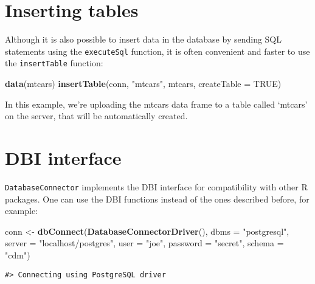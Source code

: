 \documentclass[]{article}
\newenvironment{Shaded}{\begin{snugshade}}{\end{snugshade}}
\newcommand{\DataTypeTok}[1]{\textcolor[rgb]{0.13,0.29,0.53}{#1}}
\newcommand{\KeywordTok}[1]{\textcolor[rgb]{0.13,0.29,0.53}{\textbf{#1}}}
\newcommand{\NormalTok}[1]{#1}
\newcommand{\OtherTok}[1]{\textcolor[rgb]{0.56,0.35,0.01}{#1}}
\newcommand{\StringTok}[1]{\textcolor[rgb]{0.31,0.60,0.02}{#1}}
\begin{document}
\hypertarget{inserting-tables}{%
\section{Inserting tables}\label{inserting-tables}}

Although it is also possible to insert data in the database by sending
SQL statements using the \texttt{executeSql} function, it is often
convenient and faster to use the \texttt{insertTable} function:

\begin{Shaded}
\begin{Highlighting}[]
\KeywordTok{data}\NormalTok{(mtcars)}
\KeywordTok{insertTable}\NormalTok{(conn, }\StringTok{"mtcars"}\NormalTok{, mtcars, }\DataTypeTok{createTable =} \OtherTok{TRUE}\NormalTok{)}
\end{Highlighting}
\end{Shaded}

In this example, we're uploading the mtcars data frame to a table called
`mtcars' on the server, that will be automatically created.

\hypertarget{dbi-interface}{%
\section{DBI interface}\label{dbi-interface}}

\texttt{DatabaseConnector} implements the DBI interface for
compatibility with other R packages. One can use the DBI functions
instead of the ones described before, for example:

\begin{Shaded}
\begin{Highlighting}[]
\NormalTok{conn <-}\StringTok{ }\KeywordTok{dbConnect}\NormalTok{(}\KeywordTok{DatabaseConnectorDriver}\NormalTok{(), }
                  \DataTypeTok{dbms =} \StringTok{"postgresql"}\NormalTok{,}
                  \DataTypeTok{server =} \StringTok{"localhost/postgres"}\NormalTok{,}
                  \DataTypeTok{user =} \StringTok{"joe"}\NormalTok{,}
                  \DataTypeTok{password =} \StringTok{"secret"}\NormalTok{,}
                  \DataTypeTok{schema =} \StringTok{"cdm"}\NormalTok{)}
\end{Highlighting}
\end{Shaded}

\begin{verbatim}
#> Connecting using PostgreSQL driver
\end{verbatim}
\end{document}
